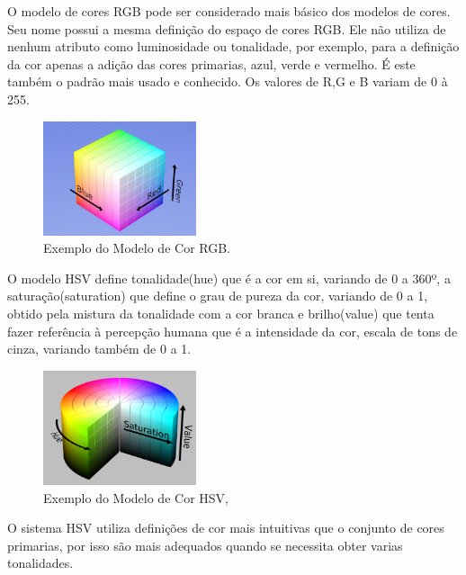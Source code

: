 O modelo de cores RGB pode ser considerado mais básico dos modelos de cores. Seu nome possui a mesma definição do espaço de cores RGB. Ele não utiliza de nenhum atributo como luminosidade ou tonalidade, por exemplo, para a definição da cor apenas a adição das cores primarias, azul, verde e vermelho. É este também o padrão mais usado e conhecido. Os valores de R,G e B variam de 0 à 255.


\begin{figure}[!h]
	\centering
	\includegraphics[width=0.4\textwidth]{rgb.pdf}
	
\caption{Exemplo do Modelo de Cor RGB.	   }
	\label{ModeloRGB}
\end{figure}



O modelo HSV define tonalidade(hue) que é a cor em si, variando de 0 a 360º, a saturação(saturation) que define o grau de pureza da cor, variando de 0 a 1, obtido pela mistura da tonalidade com a cor branca e brilho(value) que tenta fazer referência à percepção humana\cite{Leao:2005} que é a intensidade da cor, escala de tons de cinza\cite{Azevedo:2003}, variando também de 0 a 1.


\begin{figure}[!h]
	\centering
	\includegraphics[width=0.4\textwidth]{hsv.pdf}
	
	\caption{Exemplo do Modelo de Cor HSV, }
	\label{ModeloHSV}
\end{figure} 


O sistema HSV utiliza definições de cor mais intuitivas que o conjunto de cores primarias, por isso são mais adequados quando se necessita obter varias tonalidades.

